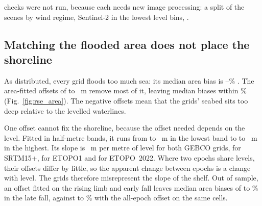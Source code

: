  checks were not run, because each needs new image processing: a split of the scenes by wind regime, Sentinel-2 in the lowest level bins, .

\subsection{Matching the flooded area does not place the shoreline}
\label{sec:res_area}
As distributed, every grid floods too much sea: its median area bias is --\% . The area-fitted offsets of  to ~m remove most of it, leaving median biases within \% (Fig.~\ref{fig:rse_area}). The negative offsets mean that the grids' seabed sits too deep relative to the levelled waterlines.



One offset cannot fix the shoreline, because the offset needed depends on the level. Fitted in half-metre bands, it runs from  to ~m in the lowest band to  to ~m in the highest. Its slope is ~m per metre of level for both GEBCO grids,  for SRTM15+,  for ETOPO1 and  for ETOPO~2022. Where two epochs share levels, their offsets differ by little, so the apparent change between epochs is a change with level. The grids therefore misrepresent the slope of the shelf. Out of sample, an offset fitted on the rising limb and early fall leaves median area biases of  to \% in the late fall, against  to \% with the all-epoch offset on the same cells.

